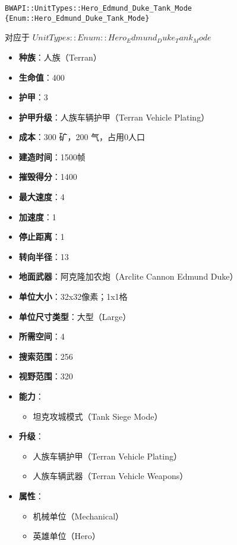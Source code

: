 \begin{tcolorbox}[colback=white, colframe=black!60!white, title=Hero\_Edmund\_Duke\_Tank\_Mode(), arc=0mm]
    \begin{verbatim}
BWAPI::UnitTypes::Hero_Edmund_Duke_Tank_Mode {Enum::Hero_Edmund_Duke_Tank_Mode}
    \end{verbatim}
    对应于  $ UnitTypes::Enum::Hero_Edmund_Duke_Tank_Mode $ 
    \begin{itemize}
        \item \textbf{种族}：人族（Terran）
        \item \textbf{生命值}：400
        \item \textbf{护甲}：3
        \item \textbf{护甲升级}：人族车辆护甲（Terran Vehicle Plating）
        \item \textbf{成本}：300 矿，200 气，占用0人口
        \item \textbf{建造时间}：1500帧
        \item \textbf{摧毁得分}：1400
        \item \textbf{最大速度}：4
        \item \textbf{加速度}：1
        \item \textbf{停止距离}：1
        \item \textbf{转向半径}：13
        \item \textbf{地面武器}：阿克隆加农炮（Arclite Cannon Edmund Duke）
        \item \textbf{单位大小}：32x32像素；1x1格
        \item \textbf{单位尺寸类型}：大型（Large）
        \item \textbf{所需空间}：4
        \item \textbf{搜索范围}：256
        \item \textbf{视野范围}：320
        \item \textbf{能力}：
            \begin{itemize}
                \item 坦克攻城模式（Tank Siege Mode）
            \end{itemize}
        \item \textbf{升级}：
            \begin{itemize}
                \item 人族车辆护甲（Terran Vehicle Plating）
                \item 人族车辆武器（Terran Vehicle Weapons）
            \end{itemize}
        \item \textbf{属性}：
            \begin{itemize}
                \item 机械单位（Mechanical）
                \item 英雄单位（Hero）
            \end{itemize}
    \end{itemize}
    
\end{tcolorbox}

